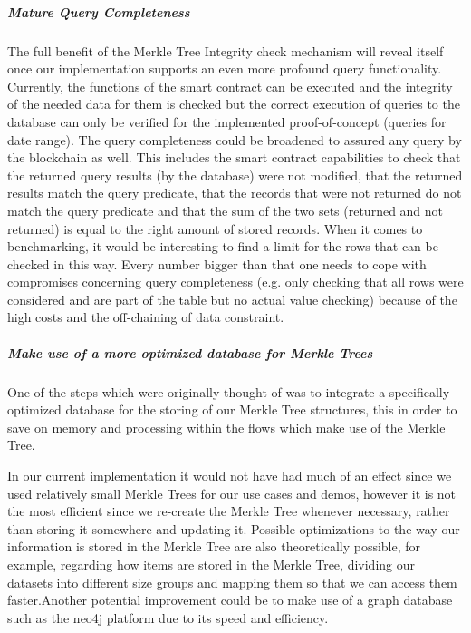 \subparagraph{Mature Query Completeness}
The full benefit of the Merkle Tree Integrity check mechanism will reveal itself once our implementation supports an even more profound query functionality. Currently, the functions of the smart contract can be executed and the integrity of the needed data for them is checked but the correct execution of queries to the database can only be verified for the implemented proof-of-concept (queries for date range). The query completeness could be broadened to assured any query by the blockchain as well. This includes the smart contract capabilities to check that the returned query results (by the database) were not modified, that the returned results match the query predicate, that the records that were not returned do not match the query predicate and that the sum of the two sets (returned and not returned) is equal to the right amount of stored records.
When it comes to benchmarking, it would be interesting to find a limit for the rows that can be checked in this way. Every number bigger than that one needs to cope with compromises concerning query completeness (e.g. only checking that all rows were considered and are part of the table but no actual value checking) because of the high costs and the off-chaining of data constraint.

\subparagraph{Make use of a more optimized database for Merkle Trees}
One of the steps which were originally thought of was to integrate a specifically optimized database for the storing of our Merkle Tree structures, this in order to save on memory and processing within the flows which make use of the Merkle Tree.

In our current implementation it would not have had much of an effect since we used relatively small Merkle Trees for our use cases and demos, however it is not the most efficient since we re-create the Merkle Tree whenever necessary, rather than storing it somewhere and updating it.
Possible optimizations to the way our information is stored in the Merkle Tree are also theoretically possible, for example, regarding how items are stored in the Merkle Tree, dividing our datasets into different size groups and mapping them so that we can access them faster.Another potential improvement could be to make use of a graph database such as the neo4j platform due to its speed and efficiency.


